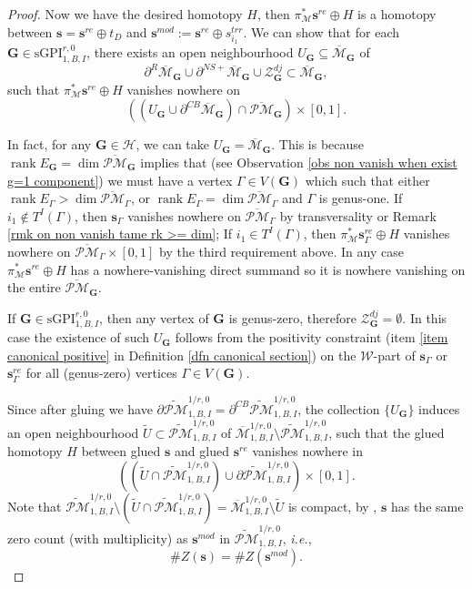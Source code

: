 \documentclass[11pt]{amsart}
\theoremstyle{definition}
\theoremstyle{remark}
\newcommand{\oPMb}{{\overline{\mathcal{PM}}}}
\newcommand{\nontilde}{}
\newcommand{\<}{\left<}
\renewcommand{\>}{\right>}
\numberwithin{equation}{section}
\DeclareMathOperator{\rk}{rank}
\def\Mbar{{\overline{\mathcal M}}}
\def\sGPI{\text{sGPI}}
\begin{document}
\begin{proof}
        Now we have the desired homotopy $H$, then $\pi^*_{\mathcal M} \bm{s}^{re}\oplus H$ is a homotopy between $\bm{s}=\bm{s}^{re}\oplus t_D$ and $\bm{s}^{mod}:=\bm{s}^{re} \oplus \nontilde{s}^{trr}_{i_1}$. 
        We can show that for each $\bm{G}\in \sGPI^{r,0}_{1,B,I}$, there exists an open neighbourhood $U_{\bm{G}}\subseteq \Mbar_{\bm{G}}$ of 
     $$\partial^{R}\Mbar_{\bm{G}}\cup \partial^{NS+}\Mbar_{\bm{G}}\cup \mathcal Z^{dj}_{\bm{G}}\subset \Mbar_{\bm{G}},$$ 
     such that $\pi^*_{\mathcal M} \bm{s}^{re}\oplus H$ vanishes nowhere on 
     $$
     \left((U_{\bm{G}} \cup \partial^{CB}\Mbar_{\bm{G}})\cap \oPMb_{\bm{G}}\right)\times [0,1].
     $$
     
     In fact, for any $\bm{G}\in \bm{\mathcal H}$, we can take $U_{\bm{G}}=\Mbar_{\bm{G}}$. This is because $\rk E_{\bm{G}}=\dim \oPMb_{\bm{G}}$ implies that (see Observation \ref{obs non vanish when exist g=1 component}) we must have a vertex $\Gamma\in V(\bm{G})$ which such that either $\rk E_{\Gamma}>\dim \oPMb_{\Gamma}$, or $\rk E_{\Gamma}=\dim \oPMb_{\Gamma}$ and $\Gamma$ is genus-one. If $i_1 \notin T^I(\Gamma)$, then $\bm{s}_{\Gamma}$ vanishes nowhere on $\oPMb_{\Gamma}$ by transversality or Remark \ref{rmk on non vanish tame rk >= dim};  If $i_1 \in T^I(\Gamma)$, then $\pi^*_{\mathcal M}\bm{s}^{re}_{\Gamma}\oplus H$ vanishes nowhere on $\oPMb_{\Gamma}\times [0,1]$ by the third requirement above. In any case $\pi^*_{\mathcal M} \bm{s}^{re}\oplus H$ has a nowhere-vanishing direct summand so it is nowhere vanishing on the entire $\oPMb_{\bm{G}}$.

     If $\bm{G}\in \sGPI_{1,B,I}^{r,0}$, then any vertex of $\bm{G}$ is genus-zero, therefore $\mathcal Z^{dj}_{\bm{G}}=\emptyset$. In this case the existence of such $U_{\bm{G}}$ follows from the positivity constraint (item \ref{item canonical positive} in Definition \ref{dfn canonical section}) on the $\mathcal{W}$-part of $\bm{s}_{\Gamma}$ or $\bm{s}^{re}_{\Gamma}$ for all (genus-zero) vertices $\Gamma\in V(\bm{G})$.

     Since after gluing we have $\partial \widetilde{\mathcal{PM}}^{1/r,0}_{1,B,I}=\partial^{CB}\widetilde{\mathcal{PM}}^{1/r,0}_{1,B,I}$, the collection $\{U_{\bm{G}}\}$ induces an open neighbourhood $\widetilde{U}\subset \widetilde{\mathcal{PM}}^{1/r,0}_{1,B,I}$ of $\Mbar^{1/r,0}_{1,B,I}\setminus \widetilde{\mathcal{PM}}^{1/r,0}_{1,B,I}$, such that the glued homotopy $H$ between glued $\bm{s}$ and glued $\bm{s}^{re}$ vanishes nowhere in $$\left(\left(\widetilde{U}\cap \widetilde{\mathcal{PM}}^{1/r,0}_{1,B,I}\right)\cup \partial \widetilde{\mathcal{PM}}^{1/r,0}_{1,B,I}\right)\times [0,1].$$
     Note that $\widetilde{\mathcal{PM}}^{1/r,0}_{1,B,I}\setminus \left(\widetilde{U}\cap \widetilde{\mathcal{PM}}^{1/r,0}_{1,B,I}\right)= \Mbar^{1/r,0}_{1,B,I}\setminus \widetilde{U}$ is compact, by \cite[Lemma 4.12]{BCT2}, $\bm{s}$ has the same zero count (with multiplicity) as $\bm{s}^{mod}$ in $\widetilde{\mathcal{PM}}^{1/r,0}_{1,B,I}$, \textit{i.e.},
     \begin{equation}\label{eq zero count coincide}
     \# Z(\bm{s})  = \# Z(\bm{s}^{mod}).     
     \end{equation}


\end{proof}
\end{document}
